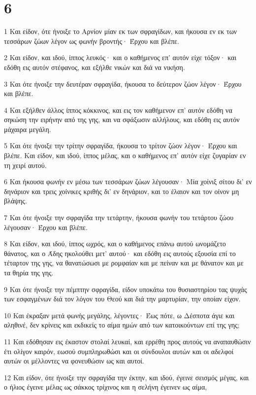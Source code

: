\chapter{6}

\par 1 Και είδον, ότε ήνοιξε το Αρνίον μίαν εκ των σφραγίδων, και ήκουσα εν εκ των τεσσάρων ζώων λέγον ως φωνήν βροντής· Έρχου και βλέπε.
\par 2 Και είδον, και ιδού, ίππος λευκός· και ο καθήμενος επ' αυτόν είχε τόξον· και εδόθη εις αυτόν στέφανος, και εξήλθε νικών και διά να νικήση.
\par 3 Και ότε ήνοιξε την δευτέραν σφραγίδα, ήκουσα το δεύτερον ζώον λέγον· Έρχου και βλέπε.
\par 4 Και εξήλθεν άλλος ίππος κόκκινος, και εις τον καθήμενον επ' αυτόν εδόθη να σηκώση την ειρήνην από της γης, και να σφάξωσιν αλλήλους, και εδόθη εις αυτόν μάχαιρα μεγάλη.
\par 5 Και ότε ήνοιξε την τρίτην σφραγίδα, ήκουσα το τρίτον ζώον λέγον· Έρχου και βλέπε. Και είδον, και ιδού, ίππος μέλας, και ο καθήμενος επ' αυτόν είχε ζυγαρίαν εν τη χειρί αυτού.
\par 6 Και ήκουσα φωνήν εν μέσω των τεσσάρων ζώων λέγουσαν· Μία χοίνιξ σίτου δι' εν δηνάριον και τρεις χοίνικες κριθής δι' εν δηνάριον, και το έλαιον και τον οίνον μη βλάψης.
\par 7 Και ότε ήνοιξε την σφραγίδα την τετάρτην, ήκουσα φωνήν του τετάρτου ζώου λέγουσαν· Έρχου και βλέπε.
\par 8 Και είδον, και ιδού, ίππος ωχρός, και ο καθήμενος επάνω αυτού ωνομάζετο θάνατος, και ο Άδης ηκολούθει μετ' αυτού· και εδόθη εις αυτούς εξουσία επί το τέταρτον της γης, να θανατώσωσι με ρομφαίαν και με πείναν και με θάνατον και με τα θηρία της γης.
\par 9 Και ότε ήνοιξε την πέμπτην σφραγίδα, είδον υποκάτω του θυσιαστηρίου τας ψυχάς των εσφαγμένων διά τον λόγον του Θεού και διά την μαρτυρίαν, την οποίαν είχον.
\par 10 Και έκραξαν μετά φωνής μεγάλης, λέγοντες· Έως πότε, ω Δέσποτα άγιε και αληθινέ, δεν κρίνεις και εκδικείς το αίμα ημών από των κατοικούντων επί της γης;
\par 11 Και εδόθησαν εις έκαστον στολαί λευκαί, και ερρέθη προς αυτούς να αναπαυθώσιν έτι ολίγον καιρόν, εωσού συμπληρωθώσι και οι σύνδουλοι αυτών και οι αδελφοί αυτών οι μέλλοντες να φονευθώσιν ως και αυτοί.
\par 12 Και είδον, ότε ήνοιξε την σφραγίδα την έκτην, και ιδού, έγεινε σεισμός μέγας, και ο ήλιος έγεινε μέλας ως σάκκος τρίχινος και η σελήνη έγεινεν ως αίμα,
